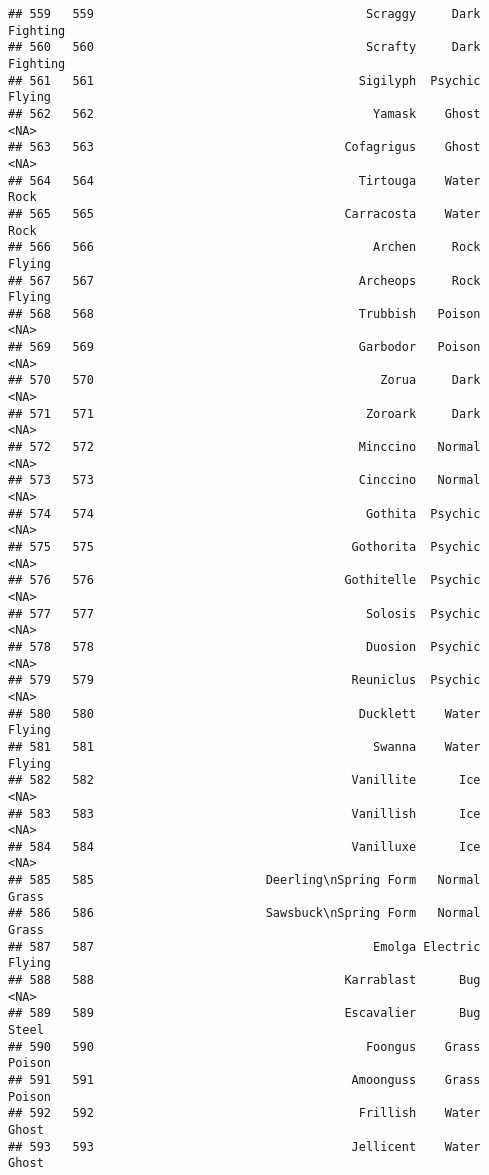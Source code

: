 \documentclass[
]{article}
\begin{document}
\begin{verbatim}
## 559   559                                      Scraggy     Dark Fighting
## 560   560                                      Scrafty     Dark Fighting
## 561   561                                     Sigilyph  Psychic   Flying
## 562   562                                       Yamask    Ghost     <NA>
## 563   563                                   Cofagrigus    Ghost     <NA>
## 564   564                                     Tirtouga    Water     Rock
## 565   565                                   Carracosta    Water     Rock
## 566   566                                       Archen     Rock   Flying
## 567   567                                     Archeops     Rock   Flying
## 568   568                                     Trubbish   Poison     <NA>
## 569   569                                     Garbodor   Poison     <NA>
## 570   570                                        Zorua     Dark     <NA>
## 571   571                                      Zoroark     Dark     <NA>
## 572   572                                     Minccino   Normal     <NA>
## 573   573                                     Cinccino   Normal     <NA>
## 574   574                                      Gothita  Psychic     <NA>
## 575   575                                    Gothorita  Psychic     <NA>
## 576   576                                   Gothitelle  Psychic     <NA>
## 577   577                                      Solosis  Psychic     <NA>
## 578   578                                      Duosion  Psychic     <NA>
## 579   579                                    Reuniclus  Psychic     <NA>
## 580   580                                     Ducklett    Water   Flying
## 581   581                                       Swanna    Water   Flying
## 582   582                                    Vanillite      Ice     <NA>
## 583   583                                    Vanillish      Ice     <NA>
## 584   584                                    Vanilluxe      Ice     <NA>
## 585   585                        Deerling\nSpring Form   Normal    Grass
## 586   586                        Sawsbuck\nSpring Form   Normal    Grass
## 587   587                                       Emolga Electric   Flying
## 588   588                                   Karrablast      Bug     <NA>
## 589   589                                   Escavalier      Bug    Steel
## 590   590                                      Foongus    Grass   Poison
## 591   591                                    Amoonguss    Grass   Poison
## 592   592                                     Frillish    Water    Ghost
## 593   593                                    Jellicent    Water    Ghost

\end{verbatim}
\end{document}
